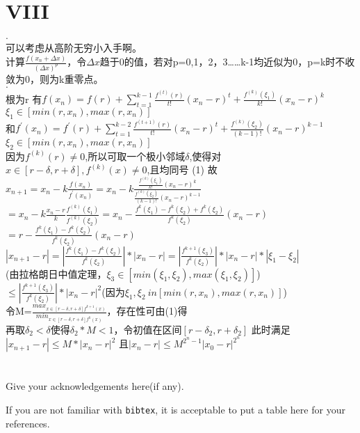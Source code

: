 \documentclass[a4paper]{article}
\begin{document}
  \section*{VIII}
  \begin{flushleft}
  \textbf{$\cdot$\\}  
    可以考虑从高阶无穷小入手啊。\\
    计算$\frac{f(x_n+\Delta x)}{(\Delta x)^p}$，令$\Delta x$趋于0的值，若对p=0,1，2，3……k-1均近似为0，p=k时不收敛为0，则为k重零点。\\
  
  \textbf{$\cdot$\\}  
    根为r
    有$f(x_n)=f(r)+\sum_{t=1}^{k-1}\frac{f^{(t)}(r)}{t!}(x_n-r)^t+\frac{f^{(k)}(\xi_1)}{k!}(x_n-r)^k$\\
    $\xi_1 \in [min(r,x_n),max(r,x_n)]$\\
    和$f^{'}(x_n)=f^{'}(r)+\sum_{t=1}^{k-2}\frac{f^{(t+1)}(r)}{t!}(x_n-r)^t+\frac{f^{(k)}(\xi_2)}{(k-1)!}(x_n-r)^{k-1}$
    $\xi_2 \in [min(r,x_n),max(r,x_n)]$\\
    因为$f^{(k)}(r) \neq 0$,所以可取一个极小邻域$\delta$,使得对$x \in [r-\delta,r+\delta], f^{(k)}(x) \neq 0$,且均同号  \hfill(1)
    故$x_{n+1}=x_n-k\frac{f(x_n)}{f^{'}(x_n)}=x_n-k\frac{\frac{f^{(k)}(\xi_1)}{k!}(x_n-r)^k}{\frac{f^{(k)}(\xi_2)}{(k-1)!}(x_n-r)^{k-1}}$\\
    $=x_n-k\frac{x_n-r}{k}\frac{f^{(k)}(\xi_1)}{f^{(k)}(\xi_2)}=x_n-\frac{f^{k}(\xi_1)-f^{k}(\xi_2)+f^{k}(\xi_2)}{f^{k}(\xi_2)}(x_n-r)$\\
    $=r-\frac{f^{k}(\xi_1)-f^{k}(\xi_2)}{f^{k}(\xi_2)}(x_n-r)$\\
    $|x_{n+1}-r|=|\frac{f^{k}(\xi_1)-f^{k}(\xi_2)}{f^{k}(\xi_2)}|*|x_n-r|=|\frac{f^{k+1}(\xi_3)}{f^{k}(\xi_2)}|*|x_n-r|*|\xi_1-\xi_2|$\\
    (由拉格朗日中值定理，$\xi_3 \in [min(\xi_1,\xi_2),max(\xi_1,\xi_2)]$)\\
    $\leq|\frac{f^{k+1}(\xi_3)}{f^{k}(\xi_2)}|*|x_n-r|^2$(因为$\xi_1,\xi_2 \ in [min(r,x_n),max(r,x_n)]$)\\
    令M=$\frac{max_{x\in[r-\delta,r+\delta]f^{k+1}(x)}}{min_{x\in[r-\delta,r+\delta]f^{k}(x)}}$，存在性可由(1)得\\
    再取$\delta_2<\delta$使得$\delta_2*M<1$，令初值在区间$[r-\delta_2,r+\delta_2]$
    此时满足$|x_{n+1}-r|\leq M*|x_n-r|^2$
    且$|x_n-r|\leq M^{2^n-1}|x_0-r|^{2^{n}}$
    
  \end{flushleft}



\section*{  }
Give your acknowledgements here(if any).


\printbibliography

If you are not familiar with \texttt{bibtex}, 
it is acceptable to put a table here for your references.
\end{document}
